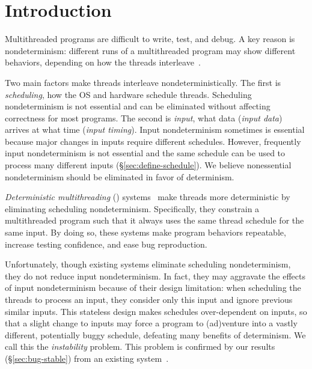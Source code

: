 \section{Introduction} \label{sec:intro}

Multithreaded programs are difficult to write, test, and debug.  A key
reason is nondeterminism: different runs of a multithreaded
program may show different behaviors, depending on how the threads
interleave~\cite{lee06}.

Two main factors make threads interleave nondeterministically.  The first
is \emph{scheduling}, how the OS and hardware schedule threads.
Scheduling nondeterminism is not essential and can be eliminated without
affecting correctness for most programs.  The second is \emph{input}, what
data (\emph{input data}) arrives at what time (\emph{input timing}).
Input nondeterminism sometimes is essential because major changes in
inputs require different schedules.  However, frequently input
nondeterminism is not essential and the same schedule can be used to
process many different inputs (\S\ref{sec:define-schedule}).  We believe
nonessential nondeterminism should be eliminated in favor of determinism.




\emph{Deterministic multithreading} (\dmt)
systems~\cite{dmp:asplos09,coredet:asplos10,kendo:asplos09} make threads
more deterministic by eliminating scheduling nondeterminism.
Specifically, they constrain a multithreaded program such that it always
uses the same thread schedule for the same input.  By doing so, these
systems make program behaviors repeatable, increase testing confidence,
and ease bug reproduction.

Unfortunately, though existing \dmt systems eliminate scheduling
nondeterminism, they do not reduce input nondeterminism.  In fact, they
may aggravate the effects of input nondeterminism because of their design
limitation: when scheduling the threads to process an input, they consider
only this input and ignore previous similar inputs.  This stateless design
makes schedules over-dependent on inputs, so that a slight change to
inputs may force a program to (ad)venture into a vastly different,
potentially buggy schedule, defeating many benefits of determinism.  We
call this the \emph{instability} problem. 
This problem is confirmed by our results (\S\ref{sec:bug-stable}) from
an existing \dmt system~\cite{coredet:asplos10}.

